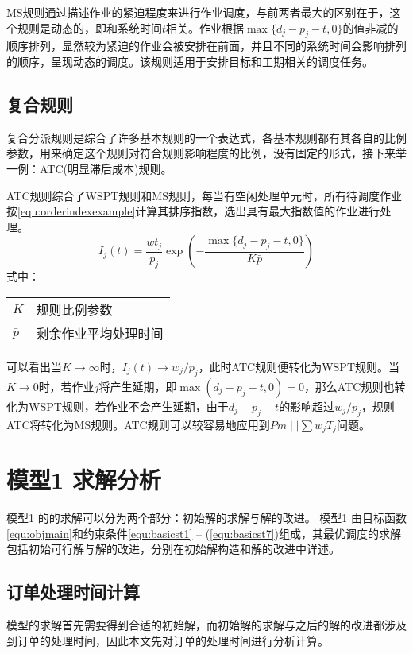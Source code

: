MS规则通过描述作业的紧迫程度来进行作业调度，与前两者最大的区别在于，这个规则是动态的，即和系统时间$t$相关。作业根据$\max \{d_j - p_j - t , 0\}$的值非减的顺序排列，显然较为紧迫的作业会被安排在前面，并且不同的系统时间会影响排列的顺序，呈现动态的调度。该规则适用于安排目标和工期相关的调度任务。
\subsection{复合规则}
复合分派规则是综合了许多基本规则的一个表达式，各基本规则都有其各自的比例参数，用来确定这个规则对符合规则影响程度的比例，没有固定的形式，接下来举一例：ATC(明显滞后成本)规则。

ATC规则综合了WSPT规则和MS规则，每当有空闲处理单元时，所有待调度作业按\eqref{equ:orderindexexample}计算其排序指数，选出具有最大指数值的作业进行处理。
\begin{equation}
I_j(t) = \frac{wt_j}{p_j}\exp\left(-\frac{\max\{d_j - p_j - t, 0\}}{K\bar p}\right) \label{equ:orderindexexample}
\end{equation}
式中：

\begin{tabular}{ll}
$K$ & 规则比例参数\\
$\bar p$ &剩余作业平均处理时间
\end{tabular}

可以看出当$K \to \infty$时，$I_j(t) \to w_j/p_j$，此时ATC规则便转化为WSPT规则。当$K \to 0$时，若作业$j$将产生延期，即$\max(d_j - p_j -t , 0 ) = 0$，那么ATC规则也转化为WSPT规则，若作业不会产生延期，由于$d_j - p_j - t$的影响超过$w_j/p_j$，规则ATC将转化为MS规则。ATC规则可以较容易地应用到$Pm\mid\mid \sum w_jT_j$问题。

\section{模型1 求解分析}
模型1 的的求解可以分为两个部分：初始解的求解与解的改进。
模型1 由目标函数\eqref{equ:objmain}和约束条件\eqref{equ:basicst1} -- (\ref{equ:basicst7})组成，其最优调度的求解包括初始可行解与解的改进，分别在初始解构造和解的改进中详述。
\subsection{订单处理时间计算}
模型的求解首先需要得到合适的初始解，而初始解的求解与之后的解的改进都涉及到订单的处理时间，因此本文先对订单的处理时间进行分析计算。


